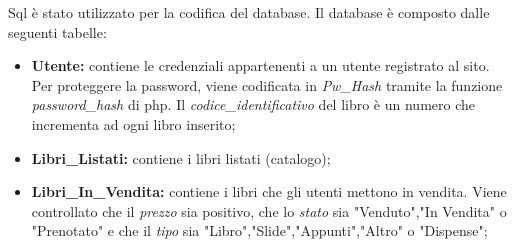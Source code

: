 Sql è stato utilizzato per la codifica del database.
Il database è composto dalle seguenti tabelle:
\begin{itemize}
    \item \textbf{Utente:} contiene le credenziali appartenenti a un utente registrato al sito. Per proteggere la password, viene codificata in \textit{Pw\_Hash} tramite la funzione \textit{password\_hash} di php. Il \textit{codice\_identificativo} del libro è un numero che incrementa ad ogni libro inserito;
    \item \textbf{Libri\_Listati:} contiene i libri listati (catalogo);
    \item \textbf{Libri\_In\_Vendita:} contiene i libri che gli utenti mettono in vendita. Viene controllato che il \textit{prezzo} sia positivo, che lo \textit{stato} sia "Venduto","In Vendita" o "Prenotato" e che il \textit{tipo} sia "Libro","Slide","Appunti","Altro" o "Dispense";
\end{itemize}